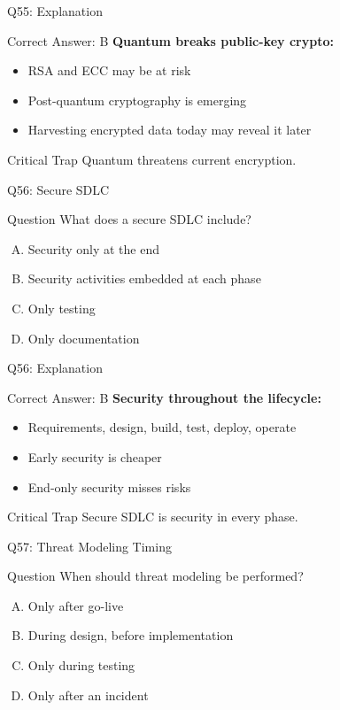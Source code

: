 \documentclass{beamer}
\begin{document}
	\begin{frame}{Q55: Explanation}
		\begin{block}{Correct Answer: B}
			\textbf{Quantum breaks public-key crypto:}
			\begin{itemize}
				\item RSA and ECC may be at risk
				\item Post-quantum cryptography is emerging
				\item Harvesting encrypted data today may reveal it later
			\end{itemize}
		\end{block}
		\begin{alertblock}{Critical Trap}
			Quantum threatens current encryption.
		\end{alertblock}
	\end{frame}
	
	\begin{frame}{Q56: Secure SDLC}
		\begin{block}{Question}
			What does a secure SDLC include?
		\end{block}
		\begin{enumerate}[(A)]
			\item Security only at the end
			\item Security activities embedded at each phase
			\item Only testing
			\item Only documentation
		\end{enumerate}
	\end{frame}
	
	\begin{frame}{Q56: Explanation}
		\begin{block}{Correct Answer: B}
			\textbf{Security throughout the lifecycle:}
			\begin{itemize}
				\item Requirements, design, build, test, deploy, operate
				\item Early security is cheaper
				\item End-only security misses risks
			\end{itemize}
		\end{block}
		\begin{alertblock}{Critical Trap}
			Secure SDLC is security in every phase.
		\end{alertblock}
	\end{frame}
	
	\begin{frame}{Q57: Threat Modeling Timing}
		\begin{block}{Question}
			When should threat modeling be performed?
		\end{block}
		\begin{enumerate}[(A)]
			\item Only after go-live
			\item During design, before implementation
			\item Only during testing
			\item Only after an incident
		\end{enumerate}
	\end{frame}
	
\end{document}
